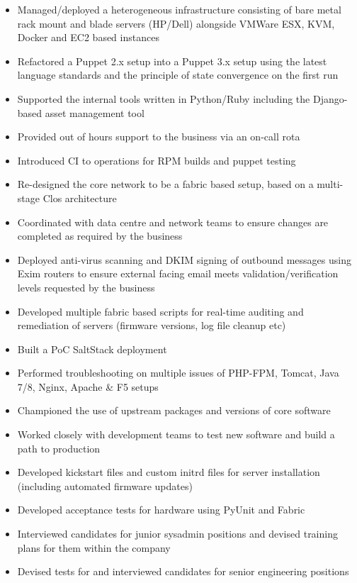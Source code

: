 \begin{itemize}
\itemsep1pt\parskip0pt
\item
  Managed/deployed a heterogeneous infrastructure consisting of bare
  metal rack mount and blade servers (HP/Dell) alongside VMWare ESX,
  KVM, Docker and EC2 based instances
\item
  Refactored a Puppet 2.x setup into a Puppet 3.x setup using the latest
  language standards and the principle of state convergence on the first
  run
\item
  Supported the internal tools written in Python/Ruby including the
  Django-based asset management tool
\item
  Provided out of hours support to the business via an on-call rota
\item
  Introduced CI to operations for RPM builds and puppet testing
\item
  Re-designed the core network to be a fabric based setup, based on a
  multi-stage Clos architecture
\item
  Coordinated with data centre and network teams to ensure changes are
  completed as required by the business
\item
  Deployed anti-virus scanning and DKIM signing of outbound messages
  using Exim routers to ensure external facing email meets
  validation/verification levels requested by the business
\item
  Developed multiple fabric based scripts for real-time auditing and
  remediation of servers (firmware versions, log file cleanup etc)
\item
  Built a PoC SaltStack deployment
\item
  Performed troubleshooting on multiple issues of PHP-FPM, Tomcat, Java
  7/8, Nginx, Apache \& F5 setups
\item
  Championed the use of upstream packages and versions of core software
\item
  Worked closely with development teams to test new software and build a
  path to production
\item
  Developed kickstart files and custom initrd files for server
  installation (including automated firmware updates)
\item
  Developed acceptance tests for hardware using PyUnit and Fabric
\item
  Interviewed candidates for junior sysadmin positions and devised
  training plans for them within the company
\item
  Devised tests for and interviewed candidates for senior engineering
  positions
\end{itemize}

